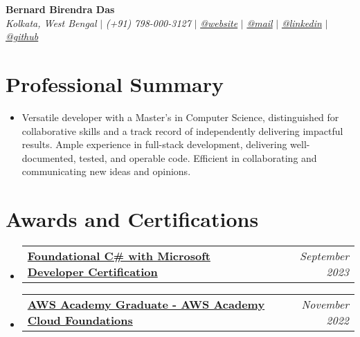 \documentclass[letterpaper,10pt]{article}
\makeatletter
\newcommand{\sectionspace}{\vspace{-20pt}}
\newcommand{\subheadingtitlevspace}{\vspace{-3pt}}
\newcommand{\titleItem}[1]{\textbf{#1}}
\newcommand{\resumeProjectHeading}[2]{
    \item
    \begin{tabular*}{0.97\textwidth}{l@{\extracolsep{\fill}}r}
        #1 & \textit{ #2} \\
    \end{tabular*}\vspace{-9pt}
}
\newcommand{\resumeSubHeadingListStart}{\subheadingtitlevspace\begin{itemize}[leftmargin=0.15in, label={}]}
\newcommand{\resumeSubHeadingListEnd}{\end{itemize}}
\makeatother
\begin{document}
\begin{flushleft}
    \textbf{\huge Bernard Birendra Das} \\
    \textit{Kolkata, West Bengal} $|$
    \textit{(+91) 798-000-3127} $|$
    \href{https://berniespace.dev}{{\textit{@website}}} $|$
    \href{mailto:bernardbdas@gmail.com}{{\textit{@mail}}} $|$
    \href{https://linkedin.com/in/bernardbdas}{{\textit{@linkedin}}} $|$
    \href{https://github.com/bernardbdas}{{\textit{@github}}}
    \vspace{-8pt}
\end{flushleft}

\section{Professional Summary}
\vspace{-3pt}
\begin{itemize}[leftmargin=0.15in, label={}]
    \item{Versatile developer with a Master's in Computer Science, distinguished for collaborative skills and a track record of independently delivering impactful results. Ample experience in full-stack development, delivering well-documented, tested, and operable code. Efficient in collaborating and communicating new ideas and opinions.}
\end{itemize}
\sectionspace

\section{Awards and Certifications}
    \resumeSubHeadingListStart
        \resumeProjectHeading{\href{https://www.freecodecamp.org/certification/bernardbdas/foundational-c-sharp-with-microsoft}{\titleItem{Foundational C\# with Microsoft Developer Certification}}}{September 2023}
        \resumeProjectHeading{\href{https://www.credly.com/badges/bdf2f146-b8c1-4cc0-b3df-81980f4df784}{\titleItem{AWS Academy Graduate - AWS Academy Cloud Foundations}}}{November 2022}
    \resumeSubHeadingListEnd

\end{document}
